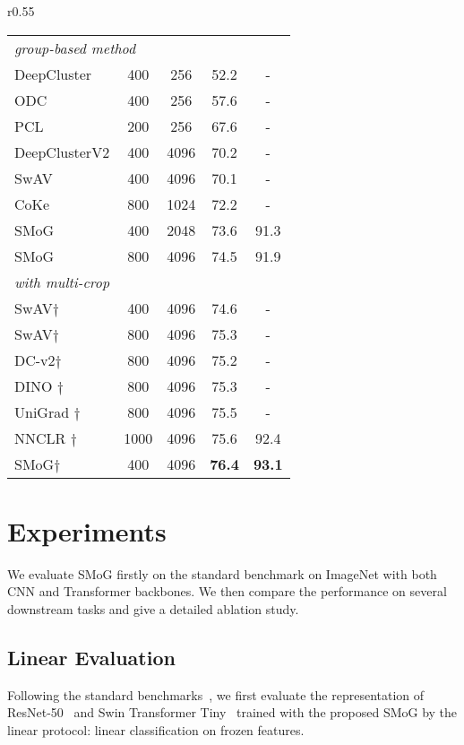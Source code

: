 \documentclass[runningheads]{style/llncs}
\begin{document}
\begin{wraptable}[29]{r}{0.55\linewidth}
{\begin{tabular}{l|cccc}
			\hline
			\multicolumn{3}{l}{\textit{group-based method}}\\
			DeepCluster & 400 & 256 & 52.2 & -\\
			ODC~\cite{ODC} & 400 & 256 & 57.6 & -\\
			PCL~\cite{pcl} & 200 & 256 & 67.6 & -\\
			DeepClusterV2 & 400 & 4096 & 70.2 & -\\
			SwAV & 400 & 4096 & 70.1 & -\\
			CoKe~\cite{coke} & 800 & 1024 & 72.2 & -\\
			\rowcolor[gray]{0.95} SMoG & 400 & 2048 & 73.6 & 91.3\\
			\rowcolor[gray]{0.95} SMoG & 800 & 4096 & 74.5 & 91.9\\
			\hline
			\multicolumn{3}{l}{\textit{with multi-crop}}\\
			SwAV$\dagger$ & 400 & 4096 & 74.6 & -\\
			SwAV$\dagger$ & 800 & 4096 & 75.3 & -\\
			DC-v2$\dagger$ & 800 & 4096 & 75.2 & - \\
			DINO $\dagger$~\cite{dino} & 800 & 4096 & 75.3 & - \\
			UniGrad $\dagger$~\cite{unigrad} & 800 & 4096 & 75.5 & - \\
			NNCLR $\dagger$~\cite{nnclr} & 1000 & 4096 & 75.6 & 92.4\\ 
			\rowcolor[gray]{0.95} SMoG$\dagger$ & 400 & 4096 & \textbf{76.4} & \textbf{93.1}\\
	\end{tabular}}
	\label{tab:res50_res}
\end{wraptable}

\section{Experiments}
We evaluate SMoG firstly on the standard benchmark on ImageNet with both CNN and Transformer backbones. We then compare the performance on several downstream tasks and give a detailed ablation study.

\subsection{Linear Evaluation}
Following the standard benchmarks~\cite{moco,simclr,byol,swav,dino,mocov3,moby}, we first evaluate the representation of ResNet-50~\cite{resnet} and Swin Transformer Tiny~\cite{SwinT} trained with the proposed SMoG by the linear protocol: linear classification on frozen features.
\end{document}
